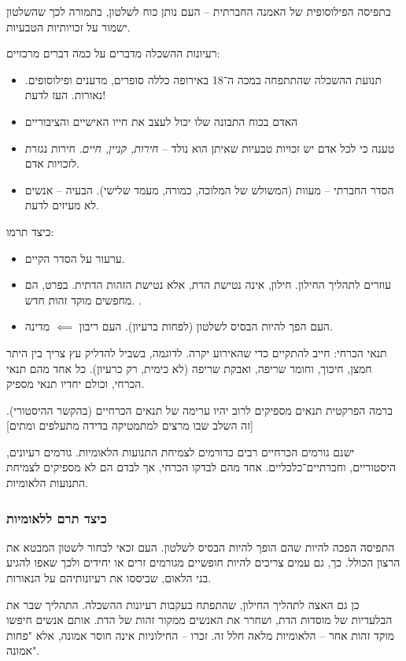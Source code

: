 \documentclass[a4paper]{book}
\begin{document}
	בתפיסה הפילוסופית של האמנה החברתית – העם נותן כוח לשלטון, בתמורה לכך שהשלטון ישמור על זכויותיות הטבעיות. 
	
	רעיונות ההשכלה מדברים על כמה דברים מרכזיים: 
	\begin{itemize}
		\item תנועת ההשכלה שהתתפחה במכה ה־18 באירופה כללה סופרים, מדענים ופילוסופים. נאורות. העז לדעת!
		\item האדם בכוח התבונה שלו יכול לעצב את חייו האישיים והציבוריים
		\item טענה כי לכל אדם יש זכויות טבעיות שאיתן הוא נולד – \textit{חירות, קניין, חיים}. חירות נגזרת לזכויות אדם. 
		\item הסדר החברתי – מעוות (המשולש של המלוכה, כמורה, מעמד שלישי). הבעיה – אנשים לא מעיזים לדעת. 
	\end{itemize}
	
	כיצד תרמו: 
	\begin{itemize}
		\item ערעור על הסדר הקיים. 
		\item עוזרים לתהליך החילון. חילון, אינה נטישת הדת, אלא נטישת הזהות הדתית. בפרט, הם מחפשים מוקד זהות חדש. . 
		\item העם הפך להיות הבסיס לשלטון (לפחות ברעיון). העם ריבון $\impliedby$ מדינה.
	\end{itemize}
	תנאי הכרחי: חייב להתקיים כדי שהאירוע יקרה.
	לדוגמה, בשביל להדליק עץ צריך בין היתר חמצן, חיכוך, וחומר שריפה, ואבקת שריפה (לא כימית, רק כרעיון). כל אחד מהם תנאי הכרחי, וכולם יחדיו תנאי מספיק. 
	
	ברמה הפרקטית תנאים מספיקים לרוב יהיו ערימה של תנאים הכרחיים (בהקשר ההיסטורי). [זה השלב שבו מרצים למתמטיקה בדידה מתעלפים ומתים]
	
	ישנם גורמים הכרחיים רבים כדורמים לצמיחת התנועות הלאומיות. גורמים רעיונים, היסטוריים, וחברתיים־כלכליים. אחד מהם לבדקו הכרחי, אך לבדם הם לא מספיקים לצמיחת התנועות הלאומיות. 
	
	
	\subsubsection{כיצד תרם ללאומיות}
	התפיסה הפכה להיות שהם הופך להיות הבסיס לשלטון. העם זכאי לבחור לשטון המבטא את הרצון הכולל. כך, גם עמים צריכים להיות חופשיים מגורמים זרים או יחידים ולכך שאפו להגיע בני הלאום, שביססו את רעיונותיהם על הנאורות. 
	
	כן גם האצה לתהליך החילון, שהתפתח בעקבות רעיונות ההשכלה. התהליך שבר את הבלעדיות של מוסדות הדת, ושחרר את האנשים ממקור זהות של הדת. אותם אנשים חיפשו מוקד זהות אחר – הלאומיות מלאה חלל זה. זכרו – החילוניות אינה חוסר אמונה, אלא "פחות אמונה". 
	
\end{document}
